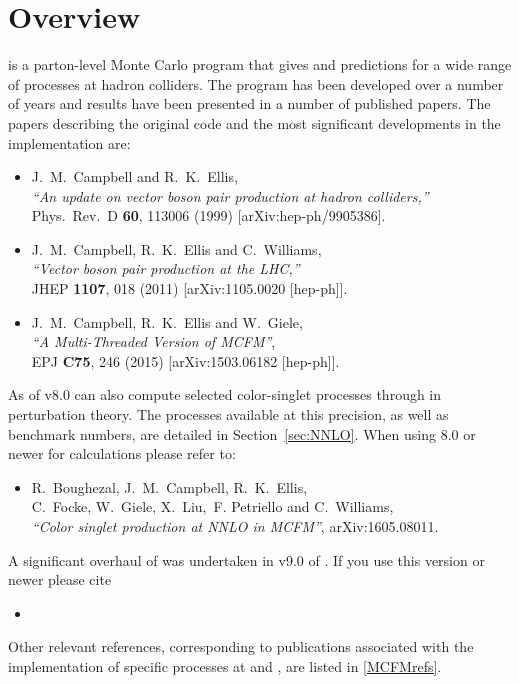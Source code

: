 \section{Overview}

\MCFM{} is a parton-level Monte Carlo program that gives \NLO{} and \NNLO{} predictions
for a wide range of processes at hadron colliders. The program has been
developed over a number of years and results have been presented in
a number of published papers.  The papers describing the original
code and the most significant developments in the \NLO{} implementation are:
\begin{itemize}
\item J.~M.~Campbell and R.~K.~Ellis, \\
  {\it ``An update on vector boson pair production at hadron colliders,''} \\
  Phys.\ Rev.\ D {\bf 60}, 113006 (1999)
  [arXiv:hep-ph/9905386].
\item J.~M.~Campbell, R.~K.~Ellis and C.~Williams, \\
  {\it ``Vector boson pair production at the LHC,''} \\
  JHEP {\bf 1107}, 018 (2011)
  [arXiv:1105.0020 [hep-ph]]. 
\item J.~M.~Campbell, R.~K.~Ellis and W.~Giele, \\
  {\it ``A Multi-Threaded Version of MCFM''}, \\
    EPJ {\bf C75}, 246 (2015)
    [arXiv:1503.06182 [hep-ph]].
\end{itemize}
 
As of v8.0 \MCFM{} can also compute selected color-singlet processes through \NNLO{} in \QCD{}
perturbation theory.  The processes available at this precision, as well as
benchmark numbers, are detailed in Section~\ref{sec:NNLO}.  When using \MCFM{} 8.0 or newer
for \NNLO{} calculations please refer to:
\begin{itemize}
\item 
  R.~Boughezal, J.~M.~Campbell, R.~K.~Ellis, \\
   C.~Focke, W.~Giele, X.~Liu,~F. Petriello and  C.~Williams, \\
  {\it ``Color singlet production at NNLO in MCFM''},
  arXiv:1605.08011.
\end{itemize}

A significant overhaul of \MCFM{} was undertaken in v9.0 of \MCFM{}. If you use
this version or newer please cite
\begin{itemize}
	\item {}
\end{itemize}

Other relevant references, corresponding to publications associated with the
implementation of specific processes at \NLO{} and \NNLO{}, are listed
in \cref{MCFMrefs}.